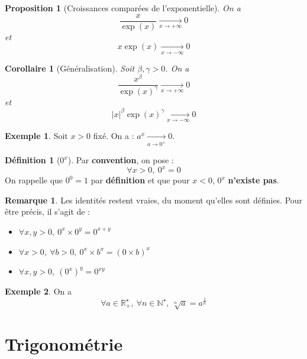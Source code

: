 \documentclass[french]{book}
\newcommand{\N}{\mathbb{N}}
\newcommand{\R}{\mathbb{R}}
\newcommand{\st}{^\star}
\theoremstyle{plain}
\newtheorem{prop}{Proposition}[chapter]
\newtheorem{cor}{Corollaire}[chapter]
\theoremstyle{definition}
\newtheorem{dfn}{Définition}[chapter]
\newtheorem{exa}{Exemple}[chapter]
\newtheorem{rmq}{Remarque}[chapter]
\theoremstyle{remark}
\begin{document}
\begin{prop}[Croissances comparées de l'exponentielle]
	On a $$\frac{x}{\exp(x)}\xrightarrow[x\to +\infty]{}0$$ et $$x\exp(x)\xrightarrow[x\to -\infty]{}0$$
\end{prop}
\begin{cor}[Généralisation]
	Soit $\beta,\gamma>0$. On a $$\frac{x^\beta}{\exp(x)^\gamma}\xrightarrow[x\to +\infty]{}0$$ et $$\lvert x\rvert^\beta\exp(x)^\gamma\xrightarrow[x\to -\infty]{}0$$
\end{cor}
\begin{exa}
	Soit $x>0$ fixé. On a : $a^x\xrightarrow[a\to 0^+]{}0$.
\end{exa}
\begin{dfn}[$0^x$]
	Par \textbf{convention}, on pose : $$\forall x>0,\ 0^x=0$$ On rappelle que $0^0=1$ par \textbf{définition} et que pour $x<0$, $0^x$ \textbf{n'existe pas}.
\end{dfn}
\begin{rmq}
	Les identités restent vraies, du moment qu'elles sont définies. Pour être précis, il s'agit de :\begin{itemize}
		\item $\forall x,y>0,\ 0^x\times 0^y=0^{x+y}$
		\item $\forall x>0,\ \forall b>0,\ 0^x\times b^x=(0\times b)^x$
		\item $\forall x,y>0,\ (0^x)^y=0^{xy}$
	\end{itemize}
\end{rmq}
\begin{exa}
	On a $$\forall a\in\R_+\st,\ \forall n\in\N\st,\ \sqrt[n]{a}=a^{\frac1n}$$
\end{exa}
\section{Trigonométrie}
\end{document}
